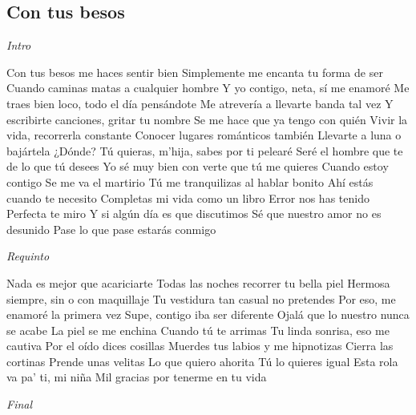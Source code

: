 \subsection{Con tus besos}
\noindent

\vspace{1cm}

\begin{guitar}
	\begin{multicols}{2}
		\textit{Intro}
		\par

		Con tus besos me haces sentir bien
		Simplemente me encanta tu forma de ser
		Cuando caminas matas a cualquier hombre
		Y yo contigo, neta, sí me enamoré
		Me traes bien loco, todo el día pensándote
		Me atrevería a llevarte banda tal vez
		Y escribirte canciones, gritar tu nombre
		Se me hace que ya tengo con quién
		Vivir la vida, recorrerla constante
		Conocer lugares románticos también
		Llevarte a luna o bajártela ¿Dónde?
		Tú quieras, m'hija, sabes por ti pelearé
		Seré el hombre que te de lo que tú desees
		Yo sé muy bien con verte que tú me quieres
		Cuando estoy contigo
		Se me va el martirio
		Tú me tranquilizas al hablar bonito
		Ahí estás cuando te necesito
		Completas mi vida como un libro
		Error nos has tenido
		Perfecta te miro
		Y si algún día es que discutimos
		Sé que nuestro amor no es desunido
		Pase lo que pase estarás conmigo

		\par
		\textit{Requinto}
		\par

		Nada es mejor que acariciarte
		Todas las noches recorrer tu bella piel
		Hermosa siempre, sin o con maquillaje
		Tu vestidura tan casual no pretendes
		Por eso, me enamoré la primera vez
		Supe, contigo iba ser diferente
		Ojalá que lo nuestro nunca se acabe
		La piel se me enchina
		Cuando tú te arrimas
		Tu linda sonrisa, eso me cautiva
		Por el oído dices cosillas
		Muerdes tus labios y me hipnotizas
		Cierra las cortinas
		Prende unas velitas
		Lo que quiero ahorita
		Tú lo quieres igual
		Esta rola va pa' ti, mi niña
		Mil gracias por tenerme en tu vida

		\par
		\textit{Final}


	\end{multicols}
\end{guitar}
